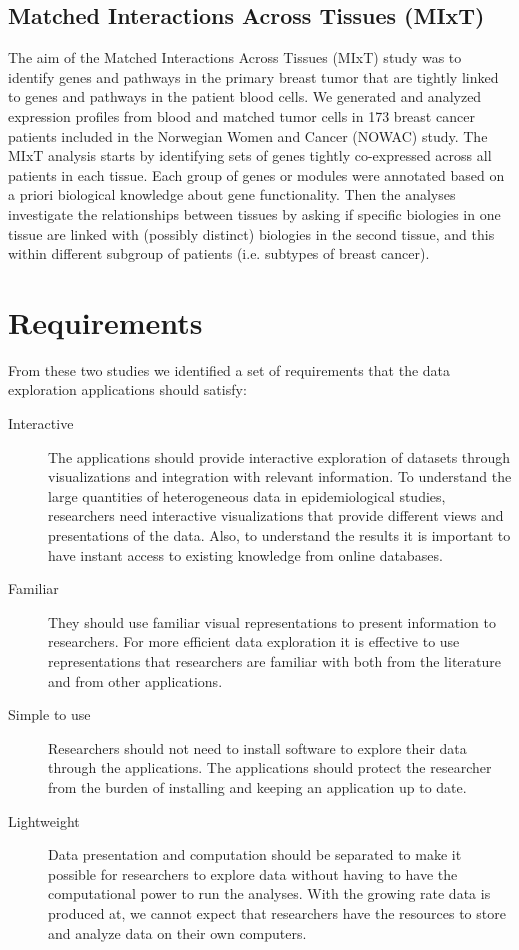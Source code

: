 \subsection{Matched Interactions Across Tissues (MIxT)}
The aim of the Matched Interactions Across Tissues (MIxT) study was to identify
genes and pathways in the primary breast tumor that are tightly linked to genes
and pathways in the patient blood cells.\cite{dumeaux2017interactions} We
generated and analyzed expression profiles from blood and matched tumor cells in
173 breast cancer patients included in the Norwegian Women and Cancer (NOWAC)
study.  The MIxT analysis starts by identifying sets of genes tightly
co-expressed across all patients in each tissue. Each group of genes or modules
were annotated based on a priori biological knowledge about gene functionality.
Then the analyses investigate the relationships between tissues by asking if
specific biologies in one tissue are linked with (possibly distinct) biologies
in the second tissue, and this within different subgroup of patients (i.e.
subtypes of breast cancer).


\section{Requirements} 
From these two studies we identified a set of requirements that the data
exploration applications should satisfy: 

\begin{description} 
\item[Interactive] The applications should provide interactive exploration
    of datasets through visualizations and integration with relevant
    information. 
    To understand the large quantities of heterogeneous data in
    epidemiological studies, researchers need interactive visualizations
    that provide different views and presentations of the data. Also, to
    understand the results it is important to have instant access to
    existing knowledge from online databases. 
    
\item[Familiar] They should use familiar visual representations to present
    information to researchers. For more efficient data exploration it is 
    effective to use representations that researchers are familiar with both from
    the literature and from other applications. 
    
\item[Simple to use] Researchers should not need to install software to
    explore their data through the applications. The applications should 
    protect the researcher from the burden of installing and keeping an
    application up to date. 
    
\item[Lightweight] Data presentation and computation should be separated
    to make it possible for researchers to explore data without having to
    have the computational power to run the analyses. With the growing rate
    data is produced at, we cannot expect that researchers have the resources to
    store and analyze data on their own computers. 
    
\end{description}


